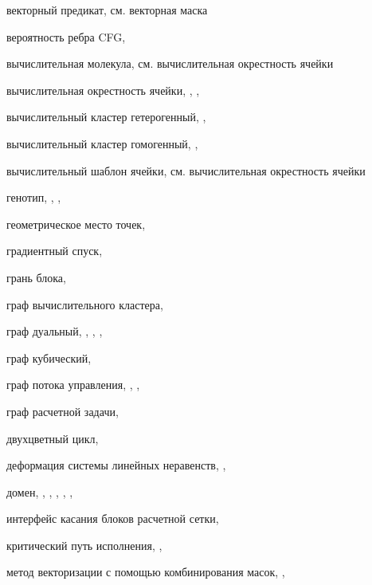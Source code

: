 векторный предикат, см. векторная маска

вероятность ребра CFG, \pageref{term:edge_prob}

вычислительная молекула, см. вычислительная окрестность ячейки

вычислительная окрестность ячейки, \pageref{term:cell_calc_template}, \pageref{term:cell_calc_template2}, \pageref{term:cell_calc_template3}

вычислительный кластер гетерогенный, \pageref{term:cluster_getero}, \pageref{term:cluster_getero2}

вычислительный кластер гомогенный, \pageref{term:cluster_gomo}, \pageref{term:cluster_gomo2}

вычислительный шаблон ячейки, см. вычислительная окрестность ячейки

генотип, \pageref{term:genotype}, \pageref{term:genotype2}, \pageref{term:genotype3}

геометрическое место точек, \pageref{term:gmt}

градиентный спуск, \pageref{term:gradient_spusk}

грань блока, \pageref{term:block_facet}

граф вычислительного кластера, \pageref{term:graph_cluster}

граф дуальный, \pageref{term:dual_graph}, \pageref{term:dual_graph2}, \pageref{term:dual_graph3}, \pageref{term:dual_graph4}

граф кубический, \pageref{term:graph_cubic}

граф потока управления, \pageref{term:graph_cfg}, \pageref{term:graph_cfg2}, \pageref{term:graph_cfg3}

граф расчетной задачи, \pageref{term:graph_task}

двухцветный цикл, \pageref{term:bicolor_cycle}

деформация системы линейных неравенств, \pageref{term:deform_sys_lin_neravenstv}, \pageref{term:deform_sys_lin_neravenstv2}

домен, \pageref{term:domain}, \pageref{term:domain2}, \pageref{term:domain3}, \pageref{term:domain4}, \pageref{term:domain5}, \pageref{term:domain6}

интерфейс касания блоков расчетной сетки, \pageref{term:block_interface}

критический путь исполнения, \pageref{term:critical_path}, \pageref{term:critical_path2}

метод векторизации с помощью комбинирования масок, \pageref{term:meth_vec_comb}, \pageref{term:meth_vec_comb2}

